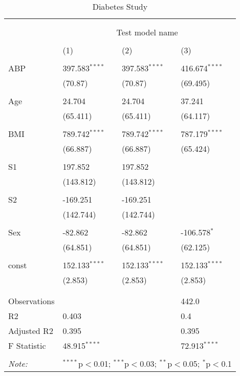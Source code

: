 \begin{table}[!htbp] \centering
  \caption{Diabetes Study}
  \label{}
\begin{tabularx}{\textwidth}{lXXX}
\\[-1.8ex]\hline
\hline \\[-1.8ex]
\\[-1.8ex]&\multicolumn{3}{c}{Test model name} \\\\[-1.8ex]& (1) & (2) & (3) \\
\hline \\[-1.8ex]
 ABP & 397.583$^{****}$ & 397.583$^{****}$ & 416.674$^{****}$ \\
&(70.87)&(70.87)&(69.495)\\
  & & & \\
 Age & 24.704$^{}$ & 24.704$^{}$ & 37.241$^{}$ \\
&(65.411)&(65.411)&(64.117)\\
  & & & \\
 BMI & 789.742$^{****}$ & 789.742$^{****}$ & 787.179$^{****}$ \\
&(66.887)&(66.887)&(65.424)\\
  & & & \\
 S1 & 197.852$^{}$ & 197.852$^{}$ & \\
&(143.812)&(143.812)& \\
  & & & \\
 S2 & -169.251$^{}$ & -169.251$^{}$ & \\
&(142.744)&(142.744)& \\
  & & & \\
 Sex & -82.862$^{}$ & -82.862$^{}$ & -106.578$^{*}$ \\
&(64.851)&(64.851)&(62.125)\\
  & & & \\
 const & 152.133$^{****}$ & 152.133$^{****}$ & 152.133$^{****}$ \\
&(2.853)&(2.853)&(2.853)\\
  & & & \\
\hline \\[-1.8ex]
 Observations\quad\quad &   &   & 442.0 \\
 R${2}$\quad\quad & 0.403 &   & 0.4 \\
 Adjusted R${2}$\quad\quad& 0.395 &   & 0.395 \\
 F Statistic\quad\quad & 48.915$^{****}$  &     & 72.913$^{****}$  \\
\hline
\hline \\[-1.8ex]
\textit{Note:} & \multicolumn{3}{r}{$^{****}$p$<$0.01; $^{***}$p$<$0.03; $^{**}$p$<$0.05; $^{*}$p$<$0.1} \\
\end{tabularx}
\end{table}